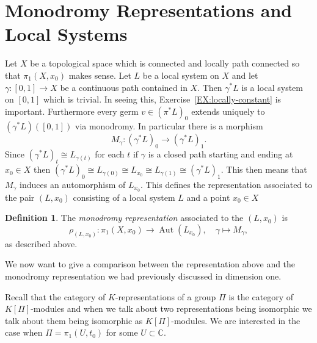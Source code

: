 \documentclass[12pt]{book}
\numberwithin{equation}{section}
\theoremstyle{definition}
\newtheorem{definition}[theorem]{Definition}
\theoremstyle{remark}
\newcommand{\CC}{\mathbb{C}}
\newcommand{\Aut}{\operatorname{Aut}}
\begin{document}
\section{Monodromy Representations and Local Systems}\label{S:locsys-to-repn}
Let $X$ be a topological space which is connected and locally path connected so that $\pi_1(X,x_0)$ makes sense. 
Let $L$ be a local system on $X$ and let $\gamma:[0,1] \to X$ be a continuous path contained in $X$. 
Then $\gamma^*L$ is a local system on $[0,1]$ which is trivial.
In seeing this, Exercise~\ref{EX:locally-constant} is important.
Furthermore every germ $v \in (\pi^*L)_0$ extends uniquely to $(\gamma^*L)([0,1])$ via monodromy.
In particular there is a morphism 
$$ M_{\gamma}: (\gamma^*L)_0 \to (\gamma^*L)_1.$$
Since $(\gamma^*L)_t \cong L_{\gamma(t)}$ for each $t$ if $\gamma$ is a closed path starting and ending at $x_0\in X$ then $(\gamma^*L)_0 \cong L_{\gamma(0)} \cong L_{x_0} \cong L_{\gamma(1)} \cong (\gamma^*L)_1$.
This then means that $M_{\gamma}$ induces an automorphism of $L_{x_0}$.
This defines the representation associated to the pair $(L,x_0)$ consisting of a local system $L$ and a point $x_0 \in X$
\begin{definition}
	The \emph{monodromy representation} associated to the $(L,x_0)$ is 
	$$\rho_{(L,x_0)}: \pi_1(X,x_0) \to \Aut(L_{x_0}), \quad \gamma \mapsto M_{\gamma}, $$
	as described above. 
\end{definition}

We now want to give a comparison between the representation above and the monodromy representation we had previously discussed in dimension one. 

Recall that the category of $K$-representations of a group $\Pi$ is the category of $K[\Pi]$-modules and when we talk about two representations being isomorphic we talk about them being isomorphic as $K[\Pi]$-modules. 
We are interested in the case when $\Pi = \pi_1(U,t_0)$ for some $U\subset \CC$. 
\end{document}
